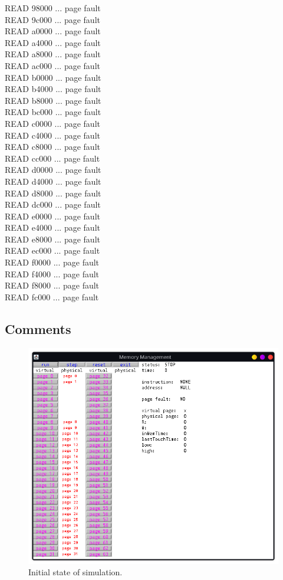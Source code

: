 \documentclass{article}
\begin{document}
READ 98000 ... page fault\\
READ 9c000 ... page fault\\
READ a0000 ... page fault\\
READ a4000 ... page fault\\
READ a8000 ... page fault\\
READ ac000 ... page fault\\
READ b0000 ... page fault\\
READ b4000 ... page fault\\
READ b8000 ... page fault\\
READ bc000 ... page fault\\
READ c0000 ... page fault\\
READ c4000 ... page fault\\
READ c8000 ... page fault\\
READ cc000 ... page fault\\
READ d0000 ... page fault\\
READ d4000 ... page fault\\
READ d8000 ... page fault\\
READ dc000 ... page fault\\
READ e0000 ... page fault\\
READ e4000 ... page fault\\
READ e8000 ... page fault\\
READ ec000 ... page fault\\
READ f0000 ... page fault\\
READ f4000 ... page fault\\
READ f8000 ... page fault\\
READ fc000 ... page fault

\rmfamily
\normalsize

\subsection{Comments}
\begin{figure}[h!]
    \centering
        \includegraphics[width=0.7\linewidth]{img/initial_state.png}
    \caption{Initial state of simulation.}
\end{figure}
\end{document}
